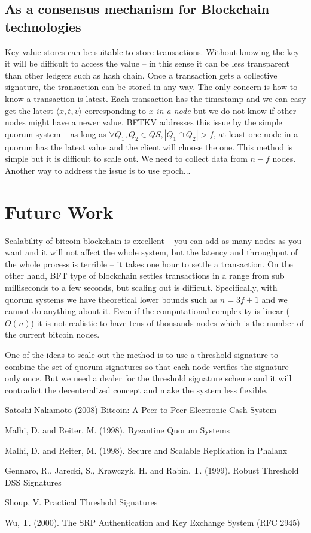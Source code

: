 \documentclass[twoside,twocolumn,10pt,fleqn]{article}
\begin{document}
\subsection{As a consensus mechanism for Blockchain technologies}
Key-value stores can be suitable to store transactions. Without
knowing the key it will be difficult to access the value -- in this
sense it can be less transparent than other ledgers such as hash
chain. Once a transaction gets a collective signature, the transaction
can be stored in any way. The only concern is how to know a
transaction is latest. Each transaction has the timestamp and we can
easy get the latest $\langle x, t, v \rangle$ corresponding to $x$
{\em in a node} but we do not know if other nodes might have a newer
value. BFTKV addresses this issue by the simple quorum system -- as
long as $\forall Q_1, Q_2 \in QS, |Q_1 \cap Q_2| > f$, at least one
node in a quorum has the latest value and the client will choose the
one. This method is simple but it is difficult to scale out. We need
to collect data from $n - f$ nodes. Another way to address the issue
is to use epoch...

\section{Future Work}

Scalability of bitcoin blockchain is excellent -- you can add as many
nodes as you want and it will not affect the whole system, but the
latency and throughput of the whole process is terrible -- it takes
one hour to settle a transaction.
On the other hand, BFT type of blockchain settles transactions in a
range from sub milliseconds to a few seconds, but scaling out is
difficult. Specifically, with quorum systems we have theoretical lower
bounds such as $n = 3f + 1$ and we cannot do anything about it. Even
if the computational complexity is linear ($O(n)$) it is not realistic
to have tens of thousands nodes which is the number of the current
bitcoin nodes. 

One of the ideas to scale out the method is to use a threshold
signature to combine the set of quorum signatures so that each node
verifies the signature only once. But we need a dealer for the
threshold signature scheme and it will contradict the decenteralized
concept and make the system less flexible.

\begin{thebibliography}{99}

  Satoshi Nakamoto (2008) Bitcoin: A Peer-to-Peer Electronic Cash System

  Malhi, D. and Reiter, M. (1998). Byzantine Quorum Systems

  Malhi, D. and Reiter, M. (1998). Secure and Scalable Replication in Phalanx

  Gennaro, R., Jarecki, S., Krawczyk, H. and Rabin, T. (1999). Robust
  Threshold DSS Signatures

  Shoup, V. Practical Threshold Signatures
  
  Wu, T. (2000). The SRP Authentication and Key Exchange System (RFC
  2945)

\end{thebibliography}
\end{document}
